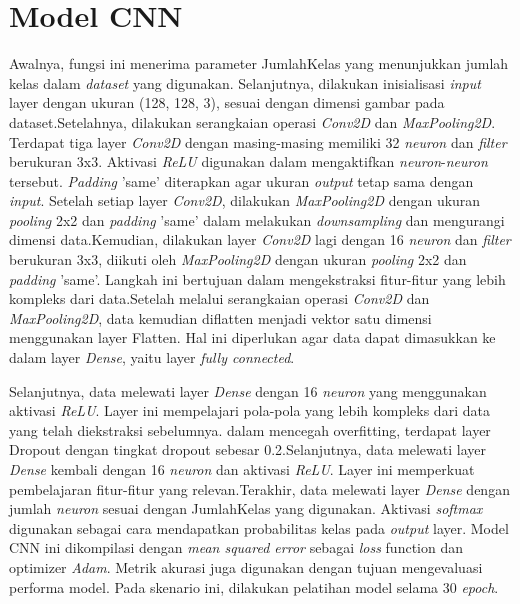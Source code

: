 \section{Model CNN}
Awalnya, fungsi ini menerima parameter JumlahKelas yang menunjukkan jumlah kelas dalam \textit{dataset} yang digunakan. Selanjutnya, dilakukan inisialisasi \textit{input} layer dengan ukuran (128, 128, 3), sesuai dengan dimensi gambar pada dataset.Setelahnya, dilakukan serangkaian operasi \textit{Conv2D} dan \textit{MaxPooling2D}. Terdapat tiga layer \textit{Conv2D} dengan masing-masing memiliki 32 \textit{neuron} dan \textit{filter} berukuran 3x3. Aktivasi \textit{ReLU} digunakan dalam mengaktifkan \textit{neuron}-\textit{neuron} tersebut. \textit{Padding} 'same' diterapkan agar ukuran \textit{output} tetap sama dengan \textit{input}. Setelah setiap layer \textit{Conv2D}, dilakukan \textit{MaxPooling2D} dengan ukuran \textit{pooling} 2x2 dan \textit{padding} 'same' dalam melakukan \textit{downsampling} dan mengurangi dimensi data.Kemudian, dilakukan layer \textit{Conv2D} lagi dengan 16 \textit{neuron} dan \textit{filter} berukuran 3x3, diikuti oleh \textit{MaxPooling2D} dengan ukuran \textit{pooling} 2x2 dan \textit{padding} 'same'. Langkah ini bertujuan dalam mengekstraksi fitur-fitur yang lebih kompleks dari data.Setelah melalui serangkaian operasi \textit{Conv2D} dan \textit{MaxPooling2D}, data kemudian diflatten menjadi vektor satu dimensi menggunakan layer Flatten. Hal ini diperlukan agar data dapat dimasukkan ke dalam layer \textit{Dense}, yaitu layer \textit{fully connected}.

Selanjutnya, data melewati layer \textit{Dense} dengan 16 \textit{neuron} yang menggunakan aktivasi \textit{ReLU}. Layer ini mempelajari pola-pola yang lebih kompleks dari data yang telah diekstraksi sebelumnya. dalam mencegah overfitting, terdapat layer Dropout dengan tingkat dropout sebesar 0.2.Selanjutnya, data melewati layer \textit{Dense} kembali dengan 16 \textit{neuron} dan aktivasi \textit{ReLU}. Layer ini memperkuat pembelajaran fitur-fitur yang relevan.Terakhir, data melewati layer \textit{Dense} dengan jumlah \textit{neuron} sesuai dengan JumlahKelas yang digunakan. Aktivasi \textit{softmax} digunakan sebagai cara mendapatkan probabilitas kelas pada \textit{output} layer. Model CNN ini dikompilasi dengan \textit{mean squared error} sebagai \textit{loss} function dan optimizer \textit{Adam}. Metrik akurasi juga digunakan dengan tujuan mengevaluasi performa model. Pada skenario ini, dilakukan pelatihan model selama 30 \textit{epoch}.

